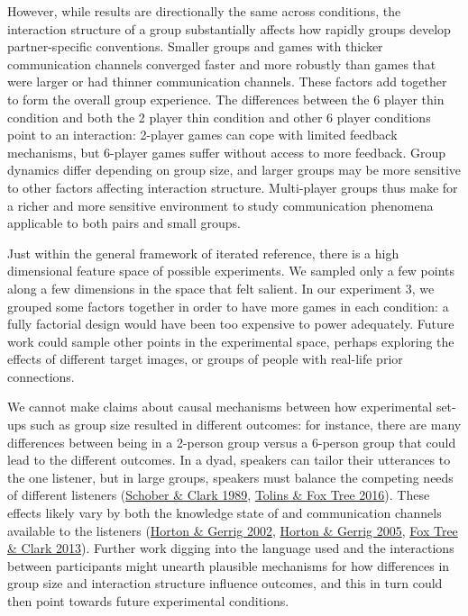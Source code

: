 \documentclass[
  english,
  a4paper,
]{article}
\begin{document}
However, while results are directionally the same across conditions, the interaction structure of a group substantially affects how rapidly groups develop partner-specific conventions. Smaller groups and games with thicker communication channels converged faster and more robustly than games that were larger or had thinner communication channels. These factors add together to form the overall group experience. The differences between the 6 player thin condition and both the 2 player thin condition and other 6 player conditions point to an interaction: 2-player games can cope with limited feedback mechanisms, but 6-player games suffer without access to more feedback. Group dynamics differ depending on group size, and larger groups may be more sensitive to other factors affecting interaction structure. Multi-player groups thus make for a richer and more sensitive environment to study communication phenomena applicable to both pairs and small groups.

Just within the general framework of iterated reference, there is a high dimensional feature space of possible experiments. We sampled only a few points along a few dimensions in the space that felt salient. In our experiment 3, we grouped some factors together in order to have more games in each condition: a fully factorial design would have been too expensive to power adequately. Future work could sample other points in the experimental space, perhaps exploring the effects of different target images, or groups of people with real-life prior connections.

We cannot make claims about causal mechanisms between how experimental set-ups such as group size resulted in different outcomes: for instance, there are many differences between being in a 2-person group versus a 6-person group that could lead to the different outcomes. In a dyad, speakers can tailor their utterances to the one listener, but in large groups, speakers must balance the competing needs of different listeners (\protect\hyperlink{ref-schober1989}{Schober \& Clark 1989}, \protect\hyperlink{ref-tolins2016}{Tolins \& Fox Tree 2016}). These effects likely vary by both the knowledge state of and communication channels available to the listeners (\protect\hyperlink{ref-horton2002}{Horton \& Gerrig 2002}, \protect\hyperlink{ref-horton2005}{Horton \& Gerrig 2005}, \protect\hyperlink{ref-fox-tree2013}{Fox Tree \& Clark 2013}). Further work digging into the language used and the interactions between participants might unearth plausible mechanisms for how differences in group size and interaction structure influence outcomes, and this in turn could then point towards future experimental conditions.
\end{document}
